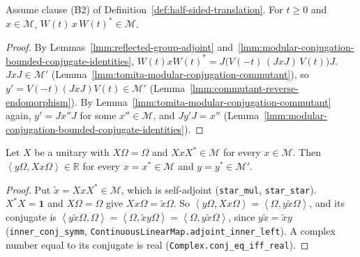 \begin{lemma}
    \label{lmm:reflected-group-endomorphism}
    \leanok
    Assume clause (B2) of Definition~\ref{def:half-sided-translation}. For $t \ge 0$ and $x \in \mathcal{M}$, $W(t)\,x\,W(t)^* \in \mathcal{M}$.
\end{lemma}
\begin{proof}
    \leanok
    By Lemmas~\ref{lmm:reflected-group-adjoint} and~\ref{lmm:modular-conjugation-bounded-conjugate-identities}, $W(t)xW(t)^* = J\big(V(-t)\,(JxJ)\,V(t)\big)J$. $JxJ \in \mathcal{M}'$ (Lemma~\ref{lmm:tomita-modular-conjugation-commutant}), so $y' = V(-t)(JxJ)V(t) \in \mathcal{M}'$ (Lemma~\ref{lmm:commutant-reverse-endomorphism}). By Lemma~\ref{lmm:tomita-modular-conjugation-commutant} again, $y' = Jx''J$ for some $x'' \in \mathcal{M}$, and $Jy'J = x''$ (Lemma~\ref{lmm:modular-conjugation-bounded-conjugate-identities}).
\end{proof}

\begin{lemma}
    \label{lmm:real-correlation}
    \leanok
    Let $X$ be a unitary with $X\Omega = \Omega$ and $XxX^* \in \mathcal{M}$ for every $x \in \mathcal{M}$. Then $\left< y\Omega, Xx\Omega \right> \in \mathbb{R}$ for every $x = x^* \in \mathcal{M}$ and $y = y^* \in \mathcal{M}'$.
\end{lemma}
\begin{proof}
    \leanok
    Put $\tilde{x} = XxX^* \in \mathcal{M}$, which is self-adjoint (\texttt{star\_mul}, \texttt{star\_star}). $X^*X = \mathbf{1}$ and $X\Omega = \Omega$ give $Xx\Omega = \tilde{x}\Omega$. So $\left< y\Omega, Xx\Omega \right> = \left< \Omega, y\tilde{x}\Omega \right>$, and its conjugate is $\left< y\tilde{x}\Omega, \Omega \right> = \left< \Omega, \tilde{x}y\Omega \right> = \left< \Omega, y\tilde{x}\Omega \right>$, since $y\tilde{x} = \tilde{x}y$ (\texttt{inner\_conj\_symm}, \texttt{ContinuousLinearMap.adjoint\_inner\_left}). A complex number equal to its conjugate is real (\texttt{Complex.conj\_eq\_iff\_real}).
\end{proof}

